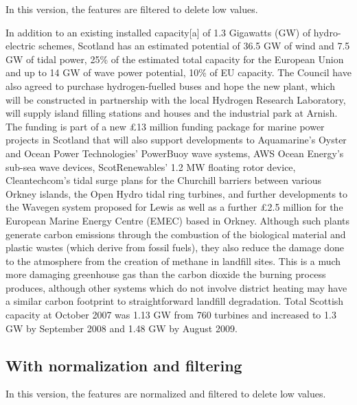 In this version, the features are filtered to delete low values.

\begin{tcolorbox}\footnotesize
	In addition to an existing installed capacity[a] of 1.3 Gigawatts (GW) of hydro-electric schemes, Scotland has an estimated potential of 36.5 GW of wind and 7.5 GW of tidal power, 25\% of the estimated total capacity for the European Union and up to 14 GW of wave power potential, 10\% of EU capacity.
	The Council have also agreed to purchase hydrogen-fuelled buses and hope the new plant, which will be constructed in partnership with the local Hydrogen Research Laboratory, will supply island filling stations and houses and the industrial park at Arnish.
	The funding is part of a new £13 million funding package for marine power projects in Scotland that will also support developments to Aquamarine's Oyster and Ocean Power Technologies' PowerBuoy wave systems, AWS Ocean Energy's sub-sea wave devices, ScotRenewables' 1.2 MW floating rotor device, Cleantechcom's tidal surge plans for the Churchill barriers between various Orkney islands, the Open Hydro tidal ring turbines, and further developments to the Wavegen system proposed for Lewis as well as a further £2.5 million for the European Marine Energy Centre (EMEC) based in Orkney.
	Although such plants generate carbon emissions through the combustion of the biological material and plastic wastes (which derive from fossil fuels), they also reduce the damage done to the atmosphere from the creation of methane in landfill sites.
	This is a much more damaging greenhouse gas than the carbon dioxide the burning process produces, although other systems which do not involve district heating may have a similar carbon footprint to straightforward landfill degradation.
	Total Scottish capacity at October 2007 was 1.13 GW from 760 turbines and increased to 1.3 GW by September 2008 and 1.48 GW by August 2009.
\end{tcolorbox}	

\subsection{With normalization and filtering}

In this version, the features are normalized and filtered to delete low values.

